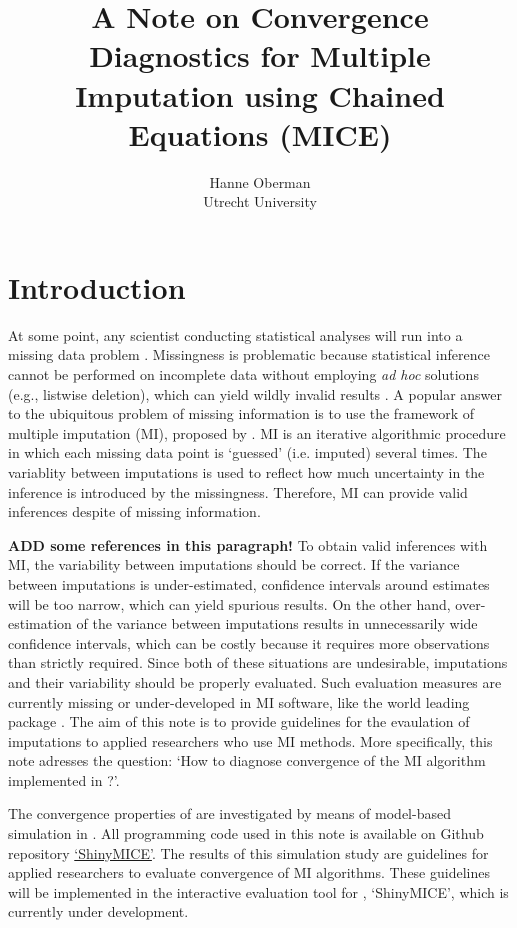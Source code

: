 \documentclass[article]{jss}
\author{Hanne Oberman\\Utrecht University}
\title{A Note on Convergence Diagnostics for Multiple Imputation using Chained Equations (MICE)}
\begin{document}

\section{Introduction} \label{sec:intro} %

At some point, any scientist conducting statistical analyses will run into a missing data problem \citep{alli02}. Missingness is problematic because statistical inference cannot be performed on incomplete data without employing \emph{ad hoc} solutions (e.g., listwise deletion), which can yield wildly invalid results \citep{buur18}. A popular answer to the ubiquitous problem of missing information is to use the framework of multiple imputation (MI), proposed by \cite{rubin87}. MI is an iterative algorithmic procedure in which each missing data point is `guessed' (i.e. imputed) several times. The variablity between imputations is used to reflect how much uncertainty in the inference is introduced by the missingness. Therefore, MI can provide valid inferences despite of missing information. 

\textbf{ADD some references in this paragraph!} To obtain valid inferences with MI, the variability between imputations should be correct. If the variance between imputations is under-estimated, confidence intervals around estimates will be too narrow, which can yield spurious results. On the other hand, over-estimation of the variance between imputations results in unnecessarily wide confidence intervals, which can be costly because it requires more observations than strictly required. Since both of these situations are undesirable, imputations and their variability should be properly evaluated. Such evaluation measures are currently missing or under-developed in MI software, like the world leading  package  \citep{mice}. 
The aim of this note is to provide guidelines for the evaulation of imputations to applied researchers who use MI methods. More specifically, this note adresses the question: `How to diagnose convergence of the MI algorithm implemented in ?'. 

The convergence properties of  are investigated by means of model-based simulation in  \citep{R}. All programming code used in this note is available on Github repository \href{https://github.com/gerkovink/shinyMice}{`ShinyMICE'}. The results of this simulation study are guidelines for applied researchers to evaluate convergence of MI algorithms. These guidelines will be implemented in the interactive evaluation tool for , `ShinyMICE', which is currently under development. %
\end{document}
